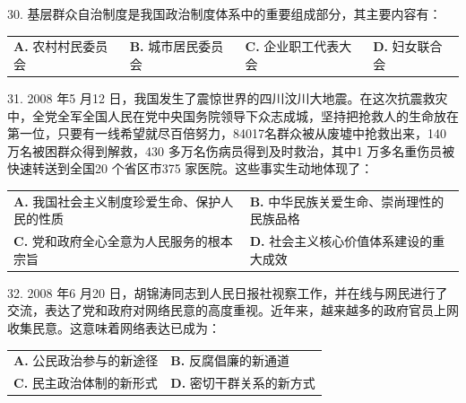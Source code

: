 \documentclass[UTF8,11pt]{ctexart}
\begin{document}
30. 基层群众自治制度是我国政治制度体系中的重要组成部分，其主要内容有：


\begin{center}\begin{tabular}{>{\raggedright\arraybackslash}p{\dimexpr(\linewidth-8\tabcolsep)/4\relax}>{\raggedright\arraybackslash}p{\dimexpr(\linewidth-8\tabcolsep)/4\relax}>{\raggedright\arraybackslash}p{\dimexpr(\linewidth-8\tabcolsep)/4\relax}>{\raggedright\arraybackslash}p{\dimexpr(\linewidth-8\tabcolsep)/4\relax}}
\textbf{A.} 农村村民委员会 & \textbf{B.} 城市居民委员会 & \textbf{C.} 企业职工代表大会 & \textbf{D.} 妇女联合会\\[.35em]\end{tabular}\end{center}

31. 2008 年5 月12 日，我国发生了震惊世界的四川汶川大地震。在这次抗震救灾中，全党全军全国人民在党中央国务院领导下众志成城，坚持把抢救人的生命放在第一位，只要有一线希望就尽百倍努力，84017名群众被从废墟中抢救出来，140 万名被困群众得到解救，430 多万名伤病员得到及时救治，其中1 万多名重伤员被快速转送到全国20 个省区市375 家医院。这些事实生动地体现了：


\begin{center}\begin{tabular}{>{\raggedright\arraybackslash}p{\dimexpr(\linewidth-4\tabcolsep)/2\relax}>{\raggedright\arraybackslash}p{\dimexpr(\linewidth-4\tabcolsep)/2\relax}}
\textbf{A.} 我国社会主义制度珍爱生命、保护人民的性质 & \textbf{B.} 中华民族关爱生命、崇尚理性的民族品格\\[.35em]
\textbf{C.} 党和政府全心全意为人民服务的根本宗旨 & \textbf{D.} 社会主义核心价值体系建设的重大成效\\[.35em]\end{tabular}\end{center}

32. 2008 年6 月20 日，胡锦涛同志到人民日报社视察工作，并在线与网民进行了交流，表达了党和政府对网络民意的高度重视。近年来，越来越多的政府官员上网收集民意。这意味着网络表达已成为：


\begin{center}\begin{tabular}{>{\raggedright\arraybackslash}p{\dimexpr(\linewidth-4\tabcolsep)/2\relax}>{\raggedright\arraybackslash}p{\dimexpr(\linewidth-4\tabcolsep)/2\relax}}
\textbf{A.} 公民政治参与的新途径 & \textbf{B.} 反腐倡廉的新通道\\[.35em]
\textbf{C.} 民主政治体制的新形式 & \textbf{D.} 密切干群关系的新方式\\[.35em]\end{tabular}\end{center}
\end{document}
